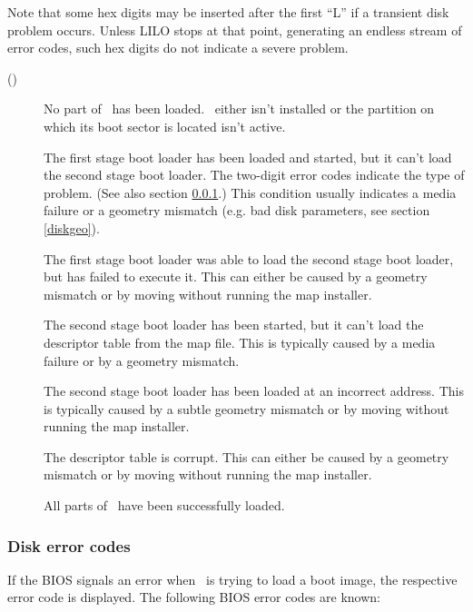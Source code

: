 Note that some hex digits may be inserted after the first ``L'' if a
transient disk problem occurs. Unless LILO stops at that point, generating
an endless stream of error codes, such hex digits do not indicate a
severe problem.

\begin{description}
  \item[\rm ()] No part of \LILO\ has been loaded.
    \LILO\ either isn't installed or the partition on which its boot
    sector is located isn't active.
  \item[] The first stage boot loader has been
    loaded and started, but it can't load the second stage boot loader.
    The two-digit error codes indicate the type of problem. (See also section
    \ref{bioserr}.) This condition usually indicates a media failure or a
    geometry mismatch (e.g. bad disk parameters, see section \ref{diskgeo}).
  \item[] The first stage boot loader was able to load the second
    stage boot loader, but has failed to execute it. This can either be
    caused by a geometry mismatch or by moving  without
    running the map installer.
  \item[] The second stage boot loader has been started, but it
    can't load the descriptor table from the map file. This is typically
    caused by a media failure or by a geometry mismatch.
  \item[] The second stage boot loader has been loaded at an
    incorrect address. This is typically caused by a subtle geometry
    mismatch or by moving  without running the map
    installer.
  \item[] The descriptor table is corrupt. This can either be caused
    by a geometry mismatch or by moving  without running
    the map installer.
  \item[] All parts of \LILO\ have been successfully loaded.
\end{description}


\subsubsection{Disk error codes}
\label{bioserr}

If the BIOS signals an error when \LILO\ is trying to load a boot
image, the respective error code is displayed. The following BIOS
error codes are known:

